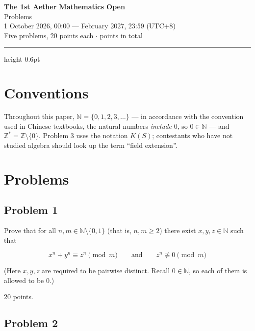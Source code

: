 \documentclass[11pt,a4paper]{article}
\begin{document}
\begin{center}
{\LARGE\bfseries The 1st Aether Mathematics Open}\\[4pt]
{\large Problems}\\[10pt]
{\normalsize 1 October 2026, 00:00 \quad ---  February 2027, 23:59 (UTC+8)}\\[4pt]
{\small Five problems, 20 points each \quad $\cdot$  points in total}
\end{center}

\vspace{2pt}
\hrule height 0.6pt
\vspace{8pt}

\section*{Conventions}

Throughout this paper,
$\mathbb{N}=\{0,1,2,3,\ldots\}$ --- in accordance with the convention used in
Chinese textbooks, the natural numbers \emph{include} $0$, so
$0\in\mathbb{N}$ --- and $\mathbb{Z}^{*}=\mathbb{Z}\setminus\{0\}$.
Problem 3 uses the notation $K(S)$; contestants who have not studied algebra
should look up the term ``field extension''.

\section*{Problems}

\subsection{Problem 1}

Prove that for all $n,m\in\mathbb{N}\setminus\{0,1\}$ (that is, $n,m\ge 2$)
there exist $x,y,z\in\mathbb{N}$ such that

$$x^n+y^n \equiv z^n \pmod{m}
\qquad\text{and}\qquad
z^n \not\equiv 0 \pmod{m}$$

(Here $x,y,z$ are required to be pairwise distinct. Recall
$0\in\mathbb{N}$, so each of them is allowed to be $0$.)

20 points.

\subsection{Problem 2}
\end{document}
